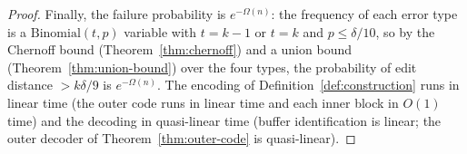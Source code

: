 \begin{proof}
  Finally, the failure probability is $e^{-\Omega(n)}$: the frequency of each
  error type is a $\mathrm{Binomial}(t,p)$ variable with $t=k-1$ or $t=k$ and
  $p\le\delta/10$, so by the Chernoff bound (Theorem~\ref{thm:chernoff}) and a
  union bound (Theorem~\ref{thm:union-bound}) over the four types, the probability
  of edit distance $>k\delta/9$ is $e^{-\Omega(n)}$. The encoding of
  Definition~\ref{def:construction} runs in linear time (the outer code runs in
  linear time and each inner block in $O(1)$ time) and the decoding in
  quasi-linear time (buffer identification is linear; the outer decoder of
  Theorem~\ref{thm:outer-code} is quasi-linear).
\end{proof}


